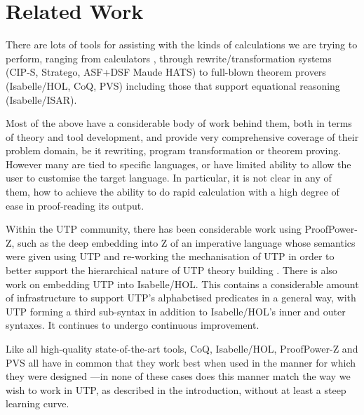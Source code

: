 \section{Related Work}\label{sec:Related}

There are lots of tools for assisting with the kinds of
calculations we are trying to perform,
ranging from calculators
\cite{Bird14},
through rewrite/transformation
systems
(CIP-S\cite{DBLP:books/sp/BauerEH87},
Stratego\cite{conf/rta/Visser01},
ASF+DSF\cite{VanDenBrand:2002:CLD}
Maude\cite{conf/rta/ClavelDELMMT03}
HATS\cite{conf/gttse/WinterB06})
to full-blown theorem provers
(Isabelle/HOL\cite{books/sp/NipkowPW02},
CoQ\cite{bk:Coq'Art:04},
PVS\cite{conf/fmcad/Shankar96})
including those that support equational reasoning
(Isabelle/ISAR\cite{man:Isabelle:Isar:Wenzel:10}).

Most of the above have a considerable body of work behind them,
both in terms of theory and tool development,
and provide very comprehensive coverage of their problem domain,
be it rewriting, program transformation or theorem proving.
However many are tied to specific languages,
or have limited ability to allow the user to customise the target language.
In particular,
it is not clear in any of them,
how to achieve the ability to do rapid calculation
with a high degree of ease in proof-reading its
output.

Within the UTP community,
there has been considerable work using Proof{\-}Power-Z,
such as the deep embedding into Z of an imperative language whose semantics
were given using UTP \cite{conf/utp/NukaW06}
and
 re-working the mechanisation of UTP in order to better support
the hierarchical nature of UTP theory building \cite{journals/entcs/ZeydaC09}.
%
There is also work on embedding UTP into Isabelle/HOL\cite{DBLP:conf/utp/FosterZW14}.
This contains a considerable amount of infrastructure to support UTP's
alphabetised predicates in a general way, with UTP forming a third
sub-syntax in addition to Isabelle/HOL's inner and outer syntaxes.
It continues to undergo continuous improvement\cite{DBLP:series/natosec/FosterW15}.

Like all high-quality state-of-the-art tools,
CoQ, Isabelle/HOL, ProofPower-Z and PVS
all have in common that they work best when used in the manner
for which they were designed%
---in none of these cases does this manner match the way
we wish to work in UTP, as described in the introduction,
without at least a steep learning curve.


